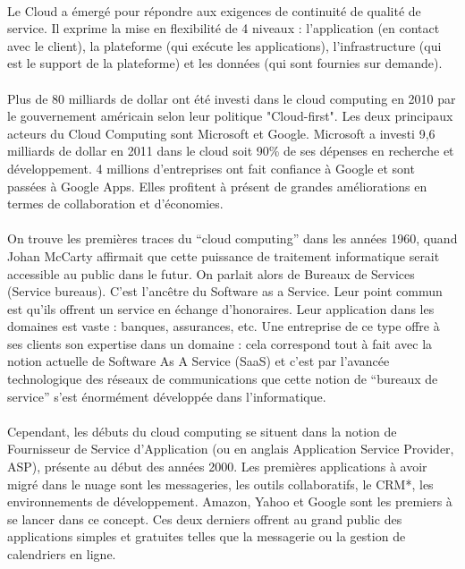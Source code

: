 \documentclass[a4paper,12pt]{report}
\begin{document}
\begin{onehalfspace}
	\paragraph*{}
	Le Cloud a émergé pour répondre aux exigences de continuité de qualité de service. Il exprime la mise en flexibilité de 4 niveaux : l’application (en contact avec le client), la plateforme (qui exécute les applications), l’infrastructure (qui est le support de la plateforme) et les données (qui sont fournies sur demande).
	
	\paragraph*{}
	Plus de 80 milliards de dollar ont été investi dans le cloud computing en 2010 par le gouvernement américain selon leur politique "Cloud-first"\cite{source:policy}. Les deux principaux acteurs du Cloud Computing sont Microsoft et Google. Microsoft a investi 9,6 milliards de dollar en 2011 dans le cloud soit 90\% de ses dépenses en recherche et développement. 4 millions d’entreprises ont fait confiance à Google et sont passées à Google Apps. Elles profitent à présent de grandes améliorations en termes de collaboration et d'économies.
	
	\paragraph*{}
	On trouve les premières traces du “cloud computing” dans les années 1960, quand Johan McCarty affirmait que cette puissance de traitement informatique serait accessible au public dans le futur. On parlait alors de Bureaux de Services (Service bureaus). C’est l’ancêtre du Software as a Service. Leur point commun est qu’ils offrent un service en échange d’honoraires. Leur application dans les domaines est vaste : banques, assurances, etc. Une entreprise de ce type offre à ses clients son expertise dans un domaine : cela correspond tout à fait avec la notion actuelle de Software As A Service (SaaS) et c’est par l’avancée technologique des réseaux de communications que cette notion de “bureaux de service”  s’est énormément développée dans l’informatique.
	
	\paragraph*{}
	Cependant, les débuts du cloud computing se situent dans la notion de Fournisseur de Service d’Application (ou en anglais Application Service Provider, ASP), présente au début des années 2000. Les premières applications à avoir migré dans le nuage sont les messageries, les outils collaboratifs, le CRM*, les environnements de développement. Amazon, Yahoo et Google sont les premiers à se lancer dans ce concept. Ces deux derniers offrent au grand public des applications simples et gratuites telles que la messagerie ou la gestion de calendriers en ligne.
	

\end{onehalfspace}
\end{document}
